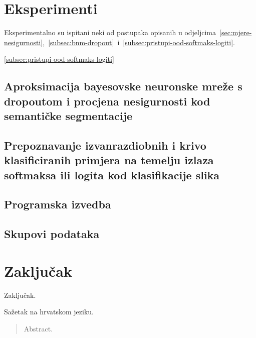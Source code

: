 \documentclass[utf8, diplomski, lmodern]{fer}
\begin{document}
 

\chapter{Eksperimenti} \label{chap:eksperimenti}

Eksperimentalno su ispitani neki od postupaka opisanih u odjeljcima~\ref{sec:mjere-nesigurnosti},~\ref{subsec:bnm-dropout}~i~\ref{subsec:pristupi-ood-softmaks-logiti}.

\ref{subsec:pristupi-ood-softmaks-logiti}

\section{Aproksimacija bayesovske neuronske mreže s dropoutom i procjena nesigurnosti kod semantičke segmentacije}

\section{Prepoznavanje izvanrazdiobnih i krivo klasificiranih primjera na temelju izlaza softmaksa ili logita kod klasifikacije slika}

\section{Programska izvedba}


\section{Skupovi podataka}



\chapter{Zaključak}

Zaključak.


 

\begin{sazetak}
Sažetak na hrvatskom jeziku.

\end{sazetak}

\begin{abstract}
Abstract.

\end{abstract}
\end{document}
